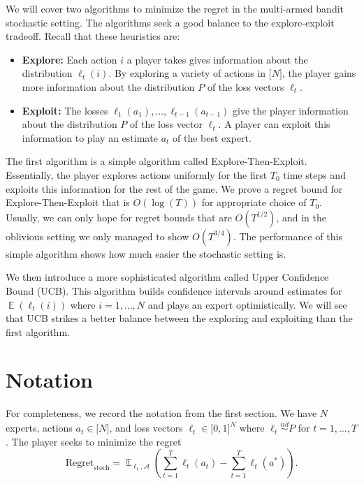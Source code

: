 \documentclass[11pt]{article}
\newcommand{\bN}{\lbrack N \rbrack}
\newcommand{\E}{\mathop{{}\mathbb{E}}}
\begin{document}
We will cover two algorithms to minimize the regret in the multi-armed bandit stochastic setting. The algorithms seek a good balance to the explore-exploit tradeoff. Recall that these heuristics are:

\begin{itemize}
   \item \textbf{Explore:} Each action $i$ a player takes gives information about the distribution $\ell_t(i)$. By exploring a variety of actions in $\bN$, the player gains more information about the distribution $P$ of the loss vectors $\ell_t$.
   \item \textbf{Exploit:} The losses $\ell_1(a_1), \ldots,\ell_{t-1}( a_{t-1})$ give the player information about the distribution $P$ of the loss vector $\ell_t$. A player can exploit this information to play an estimate $a_t$ of the best expert.
\end{itemize} 

The first algorithm is a simple algorithm called Explore-Then-Exploit. Essentially, the player explores actions uniformly for the first $T_0$ time steps and exploits this information for the rest of the game. We prove a regret bound for Explore-Then-Exploit that is $O(\log(T))$ for appropriate choice of $T_0$. Usually, we can only hope for regret bounds that are $O(T^{1/2})$, and in the oblivious setting we only managed to show $O(T^{3/4})$. The performance of this simple algorithm shows how much easier the stochastic setting is.

We then introduce a more sophisticated algorithm called Upper Confidence Bound (UCB). This algorithm builds confidence intervals around estimates for $\E(\ell_t(i))$ where $i=1,\ldots,N$ and plays an expert optimistically. We will see that UCB strikes a better balance between the exploring and exploiting than the first algorithm.



\section{Notation}

For completeness, we record the notation from the first section. We have $N$ experts, actions $a_t \in \bN$, and loss vectors $\ell_t \in \lbrack 0,1 \rbrack^N$ where $\ell_t \stackrel{iid}{\sim}  P$ for $t=1,\ldots, T$. The player seeks to minimize the regret \[\text{Regret}_\text{stoch} = \E_{\ell_t, \mathcal{A}} \left(\sum_{t=1}^T \ell_t(a_t)-\sum_{t=1}^T \ell_t(a^*)\right).\] 
\end{document}
